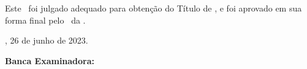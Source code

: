 \begin{folhadeaprovacao}
    \setlength{\ABNTEXsignskip}{2cm}
    \begin{center}
    {\imprimirautor}
        \vspace*{\fill}\vspace*{\fill}
        \begin{center}
            \ABNTEXchapterfont\bfseries{\imprimirtitulo}
        \end{center}
        \vspace*{\fill}
        \begin{minipage}{\textwidth}
            Este \imprimirtipotrabalho~foi julgado adequado para obtenção do Título de \printformation,
            e foi aprovado em sua forma final pelo \printprogram~da \printuniversity.
        \end{minipage}%
    \end{center}

    \begin{center}
        \imprimirlocal, 26 de junho de 2023.
    \end{center}


    \begin{flushleft}
        \textbf{Banca Examinadora:}
    \end{flushleft}




\end{folhadeaprovacao}
